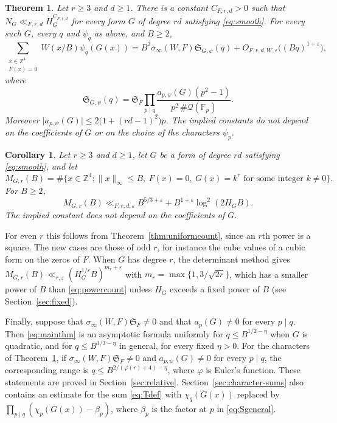 \documentclass[11pt]{amsart}
\numberwithin{equation}{section}
\numberwithin{figure}{section}
\newtheorem{theorem}{Theorem}[section]
\newtheorem{corollary}[lemma]{Corollary}
\theoremstyle{definition}
\newcommand{\Z}{\mathbb{Z}}
\newcommand{\F}{\mathcal{F}}
\renewcommand{\S}{\mathfrak{S}}
\newcommand{\eps}{\varepsilon}
\newcommand{\abs}[1]{\lvert #1\rvert}
\newcommand{\Fp}{\mathbb F_p}
\newcommand{\Qc}{\mathcal Q}
\begin{document}
\begin{theorem}\label{thm:cyclic}
Let $r\ge3$ and $d\ge1$. There is a constant $C_{F,r,d}>0$ such that
$N_G\ll_{F,r,d}H_G^{C_{F,r,d}}$ for every form $G$ of degree $rd$
satisfying \eqref{eq:smooth}. For every such $G$, every $q$ and
$\psi_q$ as above, and $B\ge2$,
\begin{equation}\label{eq:cyclicmain}
 \sum_{\substack{x\in\Z^4\\F(x)=0}}W(x/B)\psi_q(G(x))
 =B^2\sigma_\infty(W,F)\S_{G,\psi}(q)
 +O_{F,r,d,W,\eps}\big((Bq)^{1+\eps}\big),
\end{equation}
where
\begin{equation}\label{eq:cyclicfactor}
 \S_{G,\psi}(q)=\S_F\prod_{p\mid q}
 \frac{a_{p,\psi}(G)(p^2-1)}{p^2\,\#\Qc(\Fp)}.
\end{equation}
Moreover
$\abs{a_{p,\psi}(G)}\le2\big(1+(rd-1)^2\big)p$. The implied
constants do not depend on the coefficients of $G$ or on the choice
of the characters $\psi_p$.
\end{theorem}

\begin{corollary}\label{cor:powercount}
Let $r\ge3$ and $d\ge1$, let $G$ be a form of degree $rd$ satisfying
\eqref{eq:smooth}, and let
\[
 M_{G,r}(B)=\#\{x\in\Z^4:\lVert x\rVert_\infty\le B,\ F(x)=0,\
 G(x)=k^r\text{ for some integer }k\ne0\}.
\]
For $B\ge2$,
\begin{equation}\label{eq:powercount}
 M_{G,r}(B)\ll_{F,r,d,\eps}B^{5/3+\eps}+B^{1+\eps}\log^2(2H_GB).
\end{equation}
The implied constant does not depend on the coefficients of $G$.
\end{corollary}

For even $r$ this follows from Theorem~\ref{thm:uniformcount}, since
an $r$th power is a square. The new cases are those of odd $r$, for
instance the cube values of a cubic form on the zeros of $F$. When
$G$ has degree $r$, the determinant method gives
$M_{G,r}(B)\ll_{r,\eps}(H_G^{1/r}B)^{m_r+\eps}$ with
$m_r=\max\{1,3/\sqrt{2r}\}$, which has a smaller power of $B$ than
\eqref{eq:powercount} unless $H_G$ exceeds a fixed power of $B$ (see
Section~\ref{sec:fixed}).

Finally, suppose that $\sigma_\infty(W,F)\S_F\ne0$ and that
$a_p(G)\ne0$ for every $p\mid q$. Then \eqref{eq:mainthm} is an
asymptotic formula uniformly for $q\le B^{1/2-\eta}$ when $G$ is
quadratic, and for $q\le B^{1/3-\eta}$ in general, for every fixed
$\eta>0$. For the characters of Theorem~\ref{thm:cyclic}, if
$\sigma_\infty(W,F)\S_F\ne0$ and $a_{p,\psi}(G)\ne0$ for every
$p\mid q$, the corresponding range is
$q\le B^{2/(\varphi(r)+4)-\eta}$, where $\varphi$ is Euler's
function. These statements are proved in
Section~\ref{sec:relative}. Section~\ref{sec:character-sums} also
contains an estimate for the sum \eqref{eq:Tdef} with $\chi_q(G(x))$
replaced by $\prod_{p\mid q}(\chi_p(G(x))-\beta_p)$, where $\beta_p$
is the factor at $p$ in \eqref{eq:Sgeneral}.
\end{document}
